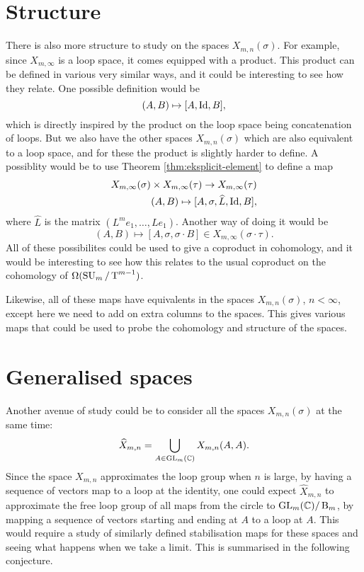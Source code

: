 \section{Structure}

There is also more structure to study on the spaces
$X_{m,n}(\sigma)$. For example, since $X_{m,\infty}$ is a
loop space, it comes equipped with a product. This product can be
defined in various very similar ways, and it could be interesting to
see how they relate. One possible definition would be
\[ (A,B) \mapsto [A,\operatorname{Id}, B], \]
which is directly inspired by the product on the loop space being
concatenation of loops. But we also have the other spaces
$X_{m,n}(\sigma)$ which are also equivalent to a loop space, and for
these the product is slightly harder to define. A possiblity would be
to use Theorem \ref{thm:eksplicit-element} to define a map
\begin{align*}
  X_{m,\infty}(\sigma) \times X_{m,\infty}(\tau) \to
  X_{m,\infty}(\tau) \\
  (A,B) \mapsto [A,\sigma,\widehat{L},\operatorname{Id},B],
\end{align*}
where $\widehat{L}$ is the matrix $(L^m e_1,\dots,Le_1)$. Another way
of doing it would be
\[ (A,B) \mapsto [A,\sigma,\sigma\cdot B] \in
X_{m,\infty}(\sigma\cdot\tau). \]
All of these possibilites could be used to give a coproduct in
cohomology, and it would be interesting to see how this relates to the
usual coproduct on the cohomology of $\Omega(\operatorname{SU}_{m}/\operatorname{T}^{m-1})$.

Likewise, all of these maps have equivalents in the spaces
$X_{m,n}(\sigma)$, $n < \infty$, except here we
need to add on extra columns to the spaces. This gives various maps
that could be used to probe the cohomology and structure of the
spaces.

\section{Generalised spaces}

Another avenue of study could be to consider all the spaces
$X_{m,n}(\sigma)$ at the same time:
\[ \widehat{X}_{m,n} = \bigcup_{A \in \operatorname{GL}_m(\mathbb{C})} X_{m,n}(A,A). \]
Since the space $X_{m,n}$ approximates the loop group when $n$ is
large, by having a sequence of vectors map to a loop at the identity,
one could expect $\widehat{X}_{m,n}$ to approximate the free loop
group of all maps from the circle to $\operatorname{GL}_m(\mathbb{C})/\operatorname{B}_m$, by mapping a
sequence of vectors starting and ending at $A$ to a loop at $A$. This
would require a study of similarly defined stabilisation maps for
these spaces and seeing what happens when we take a limit. This
is summarised in the following conjecture.

